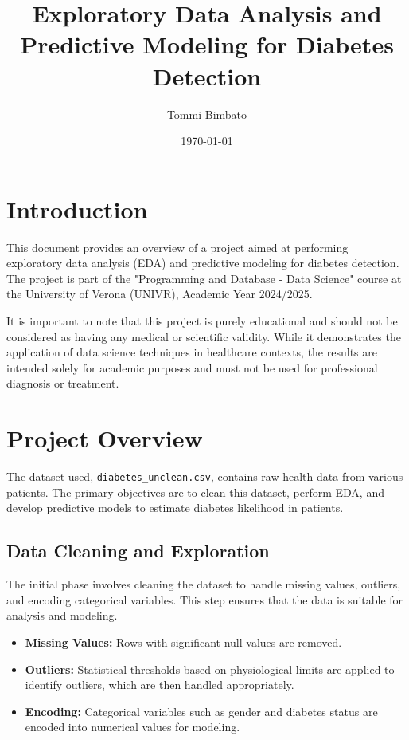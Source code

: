 \documentclass[12pt]{article}
\begin{document}
\title{Exploratory Data Analysis and Predictive Modeling for Diabetes Detection}
\author{Tommi Bimbato}
\date{\today}

\maketitle






\section{Introduction}

This document provides an overview of a project aimed at performing exploratory data analysis (EDA) and predictive modeling for diabetes detection. The project is part of the "Programming and Database - Data Science" course at the University of Verona (UNIVR), Academic Year 2024/2025.


It is important to note that this project is purely educational and should not be considered as having any medical or scientific validity. While it demonstrates the application of data science techniques in healthcare contexts, the results are intended solely for academic purposes and must not be used for professional diagnosis or treatment.



\section{Project Overview}

The dataset used, \texttt{diabetes\_unclean.csv}, contains raw health data from various patients. The primary objectives are to clean this dataset, perform EDA, and develop predictive models to estimate diabetes likelihood in patients.

\subsection{Data Cleaning and Exploration}

The initial phase involves cleaning the dataset to handle missing values, outliers, and encoding categorical variables. This step ensures that the data is suitable for analysis and modeling.

\begin{itemize}
    \item \textbf{Missing Values:} Rows with significant null values are removed.
    \item \textbf{Outliers:} Statistical thresholds based on physiological limits are applied to identify outliers, which are then handled appropriately.
    \item \textbf{Encoding:} Categorical variables such as gender and diabetes status are encoded into numerical values for modeling.
\end{itemize}
\end{document}
